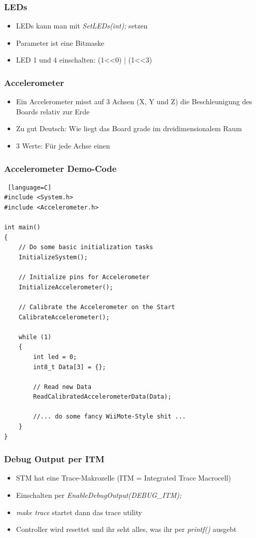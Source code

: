 \documentclass[ngerman,compress]{beamer}
\begin{document}
\begin{frame}
	\frametitle{LEDs}
	\begin{itemize}
		\item LEDs kann man mit \emph{SetLEDs(int);} setzen
		\item Parameter ist eine Bitmaske
		\item LED 1 und 4 einschalten: (1<<0) | (1<<3)
	\end{itemize}
\end{frame}

\begin{frame}
	\frametitle{Accelerometer}
	\begin{itemize}
		\item Ein Accelerometer misst auf 3 Achsen (X, Y und Z) die Beschleunigung des Boards relativ zur Erde
		\item Zu gut Deutsch: Wie liegt das Board grade im dreidimensionalem Raum
		\item 3 Werte: Für jede Achse einen
	\end{itemize}
\end{frame}

\begin{frame} [fragile]
	\frametitle{Accelerometer Demo-Code}
	\begin{lstlisting} [language=C]
#include <System.h>
#include <Accelerometer.h>

int main()
{
    // Do some basic initialization tasks
    InitializeSystem();

    // Initialize pins for Accelerometer
    InitializeAccelerometer();

    // Calibrate the Accelerometer on the Start
    CalibrateAccelerometer();

    while (1)
    {
        int led = 0;
        int8_t Data[3] = {};

        // Read new Data
        ReadCalibratedAccelerometerData(Data);

        //... do some fancy WiiMote-Style shit ...
    }
}

	\end{lstlisting}
\end{frame}

\begin{frame}
	\frametitle{Debug Output per ITM}
	\begin{itemize}
		\item STM hat eine Trace-Makrozelle (ITM = Integrated Trace Macrocell)
		\item Einschalten per \emph{EnableDebugOutput(DEBUG\_ITM);}
		\item \emph{make trace} startet dann das trace utility
		\item Controller wird resettet und ihr seht alles, was ihr per \emph{printf()} ausgebt
	\end{itemize}
\end{frame}
\end{document}
